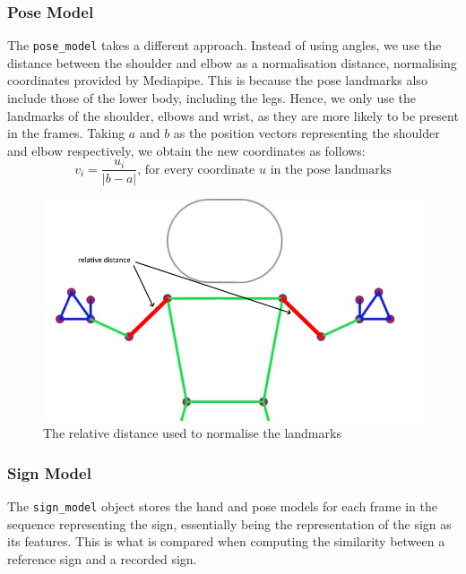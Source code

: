 \documentclass[final,rdr32.tex]{subfiles}
\begin{document}
\subsubsection{Pose Model}
\label{sec:pose_model}

The \verb|pose_model| takes a different approach. Instead of using angles, we use the distance between the shoulder and elbow as a normalisation distance, normalising coordinates provided by Mediapipe. This is because the pose landmarks also include those of the lower body, including the legs. Hence, we only use the landmarks of the shoulder, elbows and wrist, as they are more likely to be present in the frames. Taking $a$ and $b$ as the position vectors representing the shoulder and elbow respectively, we obtain the new coordinates as follows:
\begin{equation*}
    v_i = \frac{u_i}{|b - a|} \text{, for every coordinate $u$ in the pose landmarks}
\end{equation*}

\begin{figure}
    \begin{center}
        \includegraphics[width=\textwidth]{images/pose.png}
        \caption{The relative distance used to normalise the landmarks}
    \end{center}
\end{figure}

\subsubsection{Sign Model}
\label{sec:sign_model}

The \verb|sign_model| object stores the hand and pose models for each frame in the sequence representing the sign, essentially being the representation of the sign as its features. This is what is compared when computing the similarity between a reference sign and a recorded sign.
\end{document}
